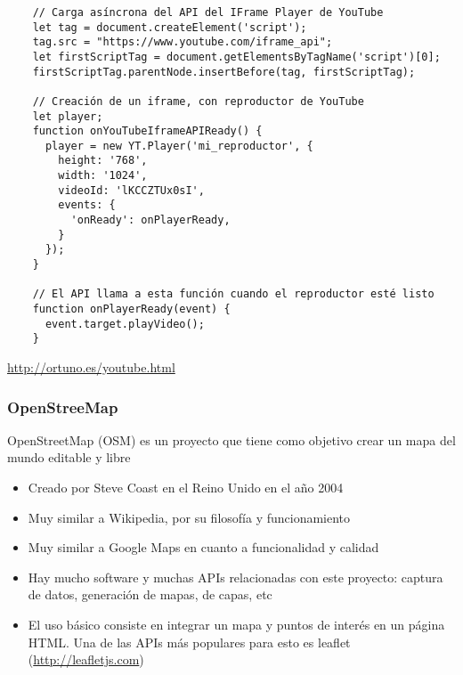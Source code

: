 \documentclass[ucs]{beamer}
\begin{document}
\begin{frame}[fragile]
\frametitle{}

  \begin{scriptsize}
  \begin{verbatim}
    // Carga asíncrona del API del IFrame Player de YouTube
    let tag = document.createElement('script');
    tag.src = "https://www.youtube.com/iframe_api";
    let firstScriptTag = document.getElementsByTagName('script')[0];
    firstScriptTag.parentNode.insertBefore(tag, firstScriptTag);

    // Creación de un iframe, con reproductor de YouTube
    let player;
    function onYouTubeIframeAPIReady() {
      player = new YT.Player('mi_reproductor', {
        height: '768',
        width: '1024',
        videoId: 'lKCCZTUx0sI',
        events: {
          'onReady': onPlayerReady,
        }
      });
    }

    // El API llama a esta función cuando el reproductor esté listo
    function onPlayerReady(event) {
      event.target.playVideo();
    }
  \end{verbatim}
  \end{scriptsize}

\begin{tiny}
\begin{flushright}
\url{http://ortuno.es/youtube.html}
\end{flushright}
\end{tiny}
\end{frame}



\begin{frame}[fragile]
\frametitle{OpenStreeMap}


OpenStreetMap (OSM) es un proyecto que tiene como objetivo crear
un mapa del mundo editable y libre

\begin{itemize}
\item
Creado por Steve Coast en el Reino Unido en el año 2004

\item
Muy similar a Wikipedia, por su filosofía y funcionamiento

\item
Muy similar a Google Maps en cuanto a funcionalidad y calidad


\item
Hay mucho software y muchas APIs relacionadas con este proyecto:
captura de datos, generación de mapas, de capas, etc


\item
El uso básico consiste en integrar un mapa y puntos de interés
en un página HTML.  Una de las APIs más populares para 
esto es leaflet (\url{http://leafletjs.com})
\end{itemize}

\end{frame}
\end{document}
